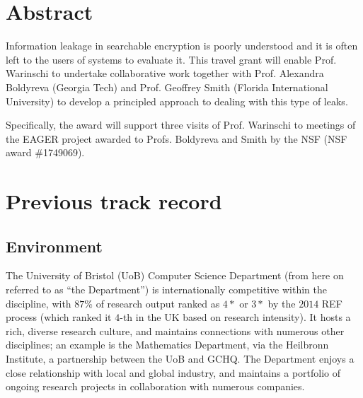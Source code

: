 
\section{Abstract}
\label{sec:abs}

Information leakage in searchable encryption is poorly understood and it is often left to the users of systems to evaluate it. 
This travel grant will enable Prof. Warinschi to undertake collaborative work together with Prof. Alexandra Boldyreva (Georgia Tech) and Prof. Geoffrey Smith (Florida International University) to develop a principled approach to dealing with this type of leaks.

Specifically, the award will support three visits of Prof. Warinschi to meetings of the EAGER project  awarded to Profs. Boldyreva and Smith by the NSF (NSF award \#1749069). 






\section{Previous track record}
\label{sec:prev}


\iffalse
\subsection{Environment}
\label{sec:prev_env}

The University of Bristol (UoB) Computer Science Department (from here 
on referred to as ``the Department'') is internationally competitive
within the discipline, with $87$\% of research output ranked as $4*$ 
or $3*$ by the $2014$ REF process (which ranked it $4$-th in the UK
based on research intensity).  It hosts a rich, diverse research 
culture, and maintains connections with numerous other disciplines; an
example is the Mathematics Department, via the Heilbronn Institute, a 
partnership between the UoB and GCHQ.  The Department enjoys a close 
relationship with local and global industry, and maintains a portfolio
of ongoing research projects in collaboration with numerous companies.  


